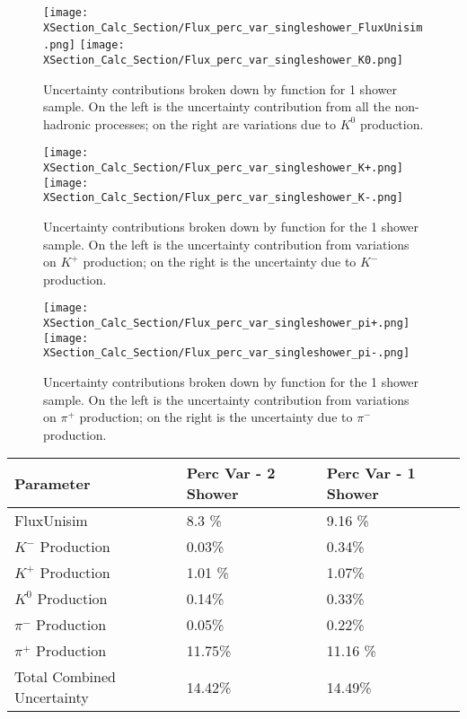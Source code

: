 \begin{figure}[H]
\centering
\texttt{[image: XSection\_Calc\_Section/Flux\_perc\_var\_singleshower\_FluxUnisim.png]}
\texttt{[image: XSection\_Calc\_Section/Flux\_perc\_var\_singleshower\_K0.png]}
\caption{ Uncertainty contributions broken down by function for 1 shower sample. On the left is the uncertainty contribution from all the non-hadronic processes; on the right are variations due to $K^0$ production. }
\label{fig:flux_1shower_unc_plots_0}
\end{figure}

\begin{figure}[H]
\centering
\texttt{[image: XSection\_Calc\_Section/Flux\_perc\_var\_singleshower\_K+.png]}
\texttt{[image: XSection\_Calc\_Section/Flux\_perc\_var\_singleshower\_K-.png]}
\caption{ Uncertainty contributions broken down by function for the 1 shower sample. On the left is the uncertainty contribution from variations on $K^+$ production; on the right is the uncertainty due to $K^-$ production. }
\label{fig:flux_1shower_unc_plots_1}
\end{figure}

\begin{figure}[H]
\centering
\texttt{[image: XSection\_Calc\_Section/Flux\_perc\_var\_singleshower\_pi+.png]}
\texttt{[image: XSection\_Calc\_Section/Flux\_perc\_var\_singleshower\_pi-.png]}
\caption{ Uncertainty contributions broken down by function for the 1 shower sample. On the left is the uncertainty contribution from variations on $\pi^+$ production; on the right is the uncertainty due to $\pi^-$ production. }
\label{fig:flux_1shower_unc_plots_2}
\end{figure}

 \begin{table}[H]
 \centering
  \begin{tabular}{| l | l | l |}
  \hline
   Parameter & Perc Var - 2 Shower & Perc Var - 1 Shower  \\ [0.1ex] \hline
 FluxUnisim & 8.3 \% & 9.16 \%  \\
 $K^-$ Production & 0.03\% & 0.34\%\\
 $K^+$ Production &  1.01 \% & 1.07\% \\
 $K^0$ Production & 0.14\% & 0.33\% \\
 $\pi^-$ Production & 0.05\% & 0.22\%\\
 $\pi^+$ Production &  11.75\% & 11.16 \% \\ \hline
 Total Combined Uncertainty & 14.42\% & 14.49\%\\ \hline
\end{tabular}
\end{table}


